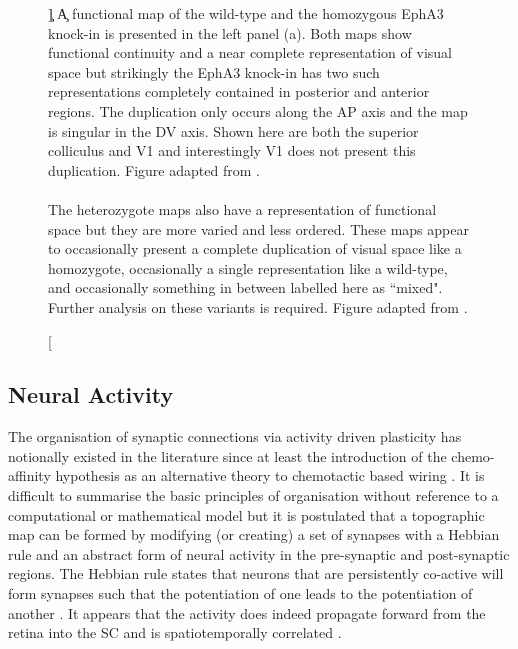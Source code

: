 \begin{figure}
	\caption[\c]{\label{fig:epha3functional} \c A functional map of the wild-type and the homozygous EphA3 knock-in is presented in the left panel (a). Both maps show functional continuity and a near complete representation of visual space but strikingly the EphA3 knock-in has two such representations completely contained in posterior and anterior regions. The duplication only occurs along the AP axis and the map is singular in the DV axis. Shown here are both the superior colliculus and V1 and interestingly V1 does not present this duplication. Figure adapted from \cite{Triplett2009-si}. \\\\
	The heterozygote maps also have a representation of functional space but they are more varied and less ordered. These maps appear to occasionally present a complete duplication of visual space like a homozygote, occasionally a single representation like a wild-type, and occasionally something in between labelled here as ``mixed". Further analysis on these variants is required.  Figure adapted from \cite{Owens2015-zv}.}
\end{figure}
\FloatBarrier
\subsection{Neural Activity}
The organisation of synaptic connections via activity driven plasticity has notionally existed in the literature since at least the introduction of the chemo-affinity hypothesis as an alternative theory to chemotactic based wiring \cite{Chung1974-oy}. It is difficult to summarise the basic principles of organisation without reference to a computational or mathematical model but it is postulated that a topographic map can be formed by modifying (or creating) a set of synapses with a Hebbian rule and an abstract form of neural activity in the pre-synaptic and post-synaptic regions. The Hebbian rule  states that neurons that are persistently co-active will form synapses such that the potentiation of one leads to the potentiation of another \cite{Abbott2000-gl}. It appears that the activity does indeed propagate forward from the retina into the SC and is spatiotemporally correlated \cite{Ackman2012-uu}.

